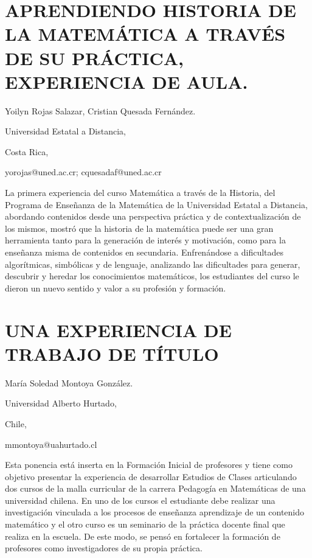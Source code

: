 \section{APRENDIENDO HISTORIA DE LA MATEMÁTICA A TRAVÉS DE SU PRÁCTICA, EXPERIENCIA
DE AULA.}

\begin{datos}

Yoilyn Rojas Salazar, Cristian Quesada Fernández.

Universidad Estatal a Distancia,

Costa Rica,

yorojas@uned.ac.cr; cquesadaf@uned.ac.cr 

\end{datos}

La primera experiencia del curso Matemática a través de la Historia,
del Programa de Enseñanza de la Matemática de la Universidad Estatal
a Distancia, abordando contenidos desde una perspectiva práctica y
de contextualización de los mismos, mostró que la historia de la matemática
puede ser una gran herramienta tanto para la generación de interés
y motivación, como para la enseñanza misma de contenidos en secundaria.
Enfrenándose a dificultades algorítmicas, simbólicas y de lenguaje,
analizando las dificultades para generar, descubrir y heredar los
conocimientos matemáticos, los estudiantes del curso le dieron un
nuevo sentido y valor a su profesión y formación.


\section{UNA EXPERIENCIA DE TRABAJO DE TÍTULO}

\begin{datos}

María Soledad Montoya González.

Universidad Alberto Hurtado,

Chile,

mmontoya@uahurtado.cl

\end{datos}

Esta ponencia está inserta en la Formación Inicial de profesores y
tiene como objetivo presentar la experiencia de desarrollar Estudios
de Clases articulando dos cursos de la malla curricular de la carrera
Pedagogía en Matemáticas de una universidad chilena. En uno de los
cursos el estudiante debe realizar una investigación vinculada a los
procesos de enseñanza aprendizaje de un contenido matemático y el
otro curso es un seminario de la práctica docente final que realiza
en la escuela. De este modo, se pensó en fortalecer la formación de
profesores como investigadores de su propia práctica.



